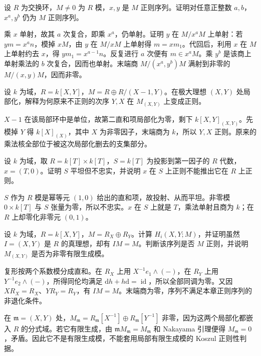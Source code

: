 \begin{exercise}\label{b3:ex:15-powers}
	设 \(R\) 为交换环，\(M\ne0\) 为 \(R\) 模，\(x,y\) 是 \(M\) 正则序列。证明对任意正整数 \(a,b\)，\(x^a,y^b\) 仍为 \(M\) 正则序列。
\end{exercise}
\begin{solution}
	乘 \(x\) 单射，故其 \(a\) 次复合，即乘 \(x^a\)，仍单射。证明 \(y\) 在 \(M/x^aM\) 上单射：若 \(ym=x^an\)，模掉 \(xM\)，由 \(y\) 在 \(M/xM\) 上单射得 \(m=xm_1\)。代回后，利用 \(x\) 在 \(M\) 上单射约去 \(x\)，得 \(ym_1=x^{a-1}n\)。反复进行 \(a\) 次便有 \(m\in x^aM\)。乘 \(y^b\) 是该商上单射乘法的 \(b\) 次复合，因而也单射。末端商 \(M/(x^a,y^b)M\) 满射到非零的 \(M/(x,y)M\)，因而非零。
\end{solution}

\begin{exercise}\label{b3:ex:15-order-localization}
	设 \(k\) 为域，\(R=k[X,Y]\)，\(M=R\oplus R/(X-1,Y)\)。在极大理想 \((X,Y)\) 处局部化，解释为何原来不正则的次序 \(Y,X\) 在 \(M_{(X,Y)}\) 上变成正则。
\end{exercise}
\begin{solution}
	\(X-1\) 在该局部环中是单位，故第二直和项局部化为零，剩下 \(k[X,Y]_{(X,Y)}\)。先模掉 \(Y\) 得 \(k[X]_{(X)}\)，其中 \(X\) 为非零因子，末端商为 \(k\)，所以 \(Y,X\) 正则。原来的乘法核全部位于被这次局部化删去的支集部分。
\end{solution}

\begin{exercise}\label{b3:ex:15-flat-not-faithful}
	设 \(k\) 为域，取 \(R=k[T]\times k[T]\)，\(S=k[T]\) 为投影到第一因子的 \(R\) 代数，\(x=(T,0)\)。证明 \(S\) 平坦但不忠实，并说明 \(x\) 在 \(S\) 上正则不能推出它在 \(R\) 上正则。
\end{exercise}
\begin{solution}
	\(S\) 作为 \(R\) 模是幂等元 \((1,0)\) 给出的直和项，故投射、从而平坦。非零模 \(0\times k[T]\) 与 \(S\) 张量为零，所以不忠实。\(x\) 在 \(S\) 上就是 \(T\)，乘法单射且商为 \(k\)；在 \(R\) 上却零化非零元 \((0,1)\)。
\end{solution}

\begin{exercise}\label{b3:ex:15-koszul-localize-unit}
	设 \(k\) 为域，\(R=k[X,Y]\)，\(M=R_X\oplus R_Y\)。计算 \(H_i(X,Y;M)\)，并证明虽然 \(I=(X,Y)\) 是 \(R\) 的真理想，却有 \(IM=M\)。判断该序列是否 \(M\) 正则，并说明 \(M_{(X,Y)}\) 是否为非零有限生成模。
\end{exercise}
\begin{solution}
	复形按两个系数模分成直和。在 \(R_X\) 上用 \(X^{-1}e_1\wedge(-)\)，在 \(R_Y\) 上用 \(Y^{-1}e_2\wedge(-)\)，所得同伦均满足 \(\mathrm{d}h+h\mathrm{d}=\operatorname{id}\)，所以全部同调为零。又因 \(XR_X=R_X\)、\(YR_Y=R_Y\)，有 \(IM=M\)。末端商为零，序列不满足本章正则序列的非退化条件。

	\ProseParagraphBreak
	在 \(\mathfrak m=(X,Y)\) 处，\(M_{\mathfrak m}=R_{\mathfrak m}[X^{-1}]\oplus R_{\mathfrak m}[Y^{-1}]\) 非零，因为这两个局部化都嵌入 \(R\) 的分式域。若它有限生成，由 \(\mathfrak mM_{\mathfrak m}=M_{\mathfrak m}\) 和 Nakayama 引理便得 \(M_{\mathfrak m}=0\)，矛盾。因此它不是有限生成模，不能套用局部有限生成模的 Koszul 正则性判据。
\end{solution}

